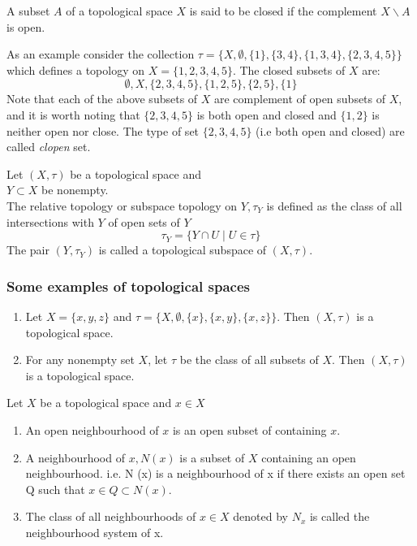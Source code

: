 \begin{defn}
    A subset $A$ of a topological space $X$ is said to be closed if the complement $X \backslash A$ is open.
\end{defn}
As an example consider the collection $\tau  = \{ X, \emptyset, \{1\}, \{3,4\},\{1,3,4\}, \{2,3,4,5\} \}$ which defines a topology on $X  = \{1,2,3,4,5\}$. The closed subsets of $X$ are:
\[
    \emptyset, X, \{2,3,4,5\}, \{1,2,5\}, \{2,5\},\{1\}  
\]
Note that each of the above subsets of $X$ are complement of open subsets of $X$, and it is worth noting that $\{2,3,4,5\}$ is both open and closed and $\{1,2\}$ is neither open nor close.\newline
The type of set $\{2,3,4,5\}$ (i.e both open and closed) are called \textit{clopen} set.

\begin{defn}[Subspace]
    Let $(X, \tau)$ be a topological space and\\
     $Y \subset X$ be nonempty.\\
    The relative topology or subspace topology on $Y, \tau_Y$ is defined as the class of all intersections with $Y$ of open sets of $Y$
    \[
        \tau_Y = \{Y \cap U  \mid U \in \tau\}
    \]
    The pair $(Y, \tau_Y)$ is called a topological subspace of $(X, \tau)$.
\end{defn}

\subsubsection*{Some examples of topological spaces}
\begin{enumerate}
    \item Let $X = \{x,y,z\}$ and $\tau = \{X, \emptyset, \{x\}, \{x,y\}, \{x,z\}\}$. Then $(X, \tau)$ is a topological space.
    \item For any nonempty set $X$, let $\tau$ be the class of all  subsets of $X$. Then $(X, \tau)$ is a topological space.
\end{enumerate}

\begin{defn}
    Let $X$ be a topological space and $x \in X$ 
    \begin{enumerate}
        \item An open neighbourhood of $x$ is an open subset of containing $x$.
        \item A neighbourhood of $x, N(x)$ is a subset of $X$ containing an open neighbourhood. i.e. N (x) is a neighbourhood of x if there exists an open set Q such that $x \in Q \subset N (x)$.
        \item The class of all neighbourhoods of $x \in X$ denoted by $N_x$ is called the neighbourhood system of x.
    \end{enumerate}
\end{defn}


